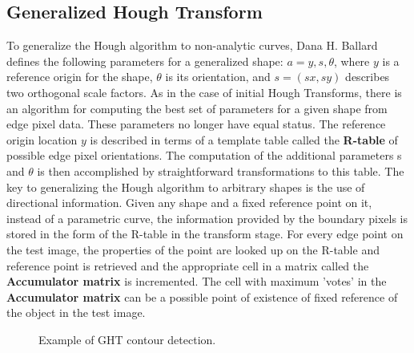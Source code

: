 \documentclass[letterpaper,12pt]{article}
\begin{document}
\subsection{Generalized Hough Transform}


To generalize the Hough algorithm to non-analytic curves,  Dana H. Ballard defines the following parameters for a generalized shape: $a={y,s,θ}$, where $y$ is a reference origin for the shape, $\theta$ is its orientation, and $s = (sx, sy)$ describes two orthogonal scale factors. As in the case of initial Hough Transforms, there is an algorithm for computing the best set of parameters for a given shape from edge pixel data. These parameters no longer have equal status. The reference origin location $y$ is described in terms of a template table called the \textbf{R-table} of possible edge pixel orientations. The computation of the additional parameters s and $\theta$ is then accomplished by straightforward transformations to this table. The key to generalizing the Hough algorithm to arbitrary shapes is the use of directional information. Given any shape and a fixed reference point on it, instead of a parametric curve, the information provided by the boundary pixels is stored in the form of the R-table in the transform stage. For every edge point on the test image, the properties of the point are looked up on the R-table and reference point is retrieved and the appropriate cell in a matrix called the \textbf{Accumulator matrix} is incremented. The cell with maximum 'votes' in the \textbf{Accumulator matrix} can be a possible point of existence of fixed reference of the object in the test image.

%


\begin{figure}[h]
  \centering
  \hfill
  \caption{Example of GHT contour detection.}
\end{figure}
\end{document}
